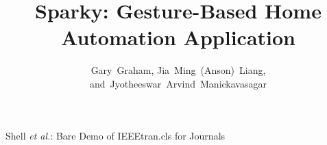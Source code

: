 \documentclass[journal]{IEEEtran}
\begin{document}
%
\title{Sparky: Gesture-Based Home Automation Application}
%
%
%

\author{Gary~Graham,
        Jia~Ming~(Anson)~Liang,
        and~Jyotheeswar~Arvind~Manickavasagar%
}

% 
%



%
{Shell \MakeLowercase{\textit{et al.}}: Bare Demo of IEEEtran.cls for Journals}
% 




\end{document}
